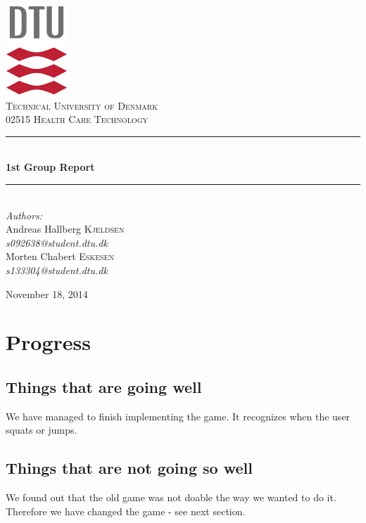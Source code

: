 \documentclass[12pt]{report}
\newcommand{\HRule}{\rule{\linewidth}{0.5mm}}
\begin{document}
\begin{titlepage}
\begin{center}

\includegraphics[scale=2.0]{../GFX/dtu_logo.pdf}\\[1cm]

\textsc{\LARGE Technical University of Denmark}\\[1.5cm]

\textsc{\Large 02515 Health Care Technology}\\[0.5cm]


\HRule \\[0.4cm]
{\huge \bfseries 1st Group Report}\\[0.1cm]
\HRule \\[1.5cm]

\large
\emph{Authors:}
\\[10pt]
Andreas Hallberg \textsc{Kjeldsen}\\
\emph{s092638@student.dtu.dk}
\\[10pt]
Morten Chabert \textsc{Eskesen}\\
\emph{s133304@student.dtu.dk}

\vfill

{\large November 18, 2014}

\end{center}
\end{titlepage}

\section*{Progress}
\subsection*{Things that are going well}
We have managed to finish implementing the game. It recognizes when the user squats or jumps.

\subsection*{Things that are not going so well}
We found out that the old game was not doable the way we wanted to do it. Therefore we have changed the game - see next section.
\end{document}
